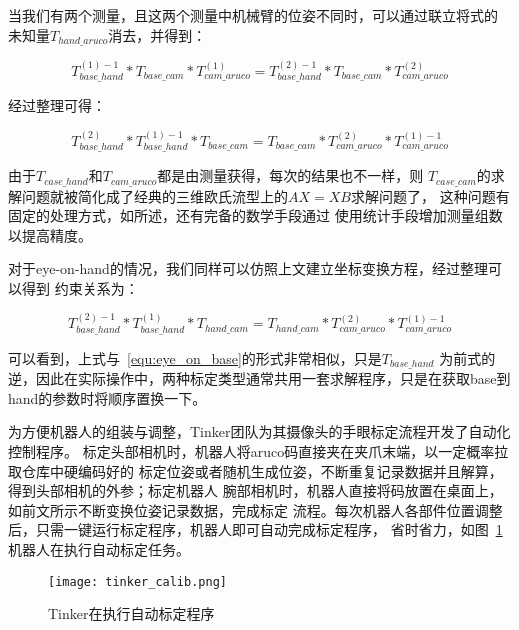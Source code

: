 当我们有两个测量，且这两个测量中机械臂的位姿不同时，可以通过联立将式的
未知量$T_{hand\_aruco}$消去，并得到：

\begin{equation}
  T_{base\_hand}^{(1)-1} * T_{base\_cam} * T_{cam\_aruco}^{(1)} = 
  T_{base\_hand}^{(2)-1} * T_{base\_cam} * T_{cam\_aruco}^{(2)}
\end{equation}

经过整理可得：

\begin{equation}
  T_{base\_hand}^{(2)} * T_{base\_hand}^{(1) -1} * T_{base\_cam}= 
  T_{base\_cam} * T_{cam\_aruco}^{(2)}  * T_{cam\_aruco}^{(1) -1} 
\label{equ:eye_on_base}
\end{equation}

由于$T_{case\_hand}$和$T_{cam\_aruco}$都是由测量获得，每次的结果也不一样，则
$T_{case\_cam}$的求解问题就被简化成了经典的三维欧氏流型上的$AX = XB$求解问题了，
这种问题有固定的处理方式，如\cite{park1994robo}所述，还有完备的数学手段通过
使用统计手段增加测量组数以提高精度\cite{tsai1989new}。

对于eye-on-hand的情况，我们同样可以仿照上文建立坐标变换方程，经过整理可以得到
约束关系为：

\begin{equation}
  T_{base\_hand}^{(2) -1} * T_{base\_hand}^{(1)} * T_{hand\_cam}= 
  T_{hand\_cam} * T_{cam\_aruco}^{(2)}  * T_{cam\_aruco}^{(1) -1} 
\label{equ:eye_on_hand}
\end{equation}

可以看到，上式与~\ref{equ:eye_on_base}的形式非常相似，只是$T_{base\_hand}$
为前式的逆，因此在实际操作中，两种标定类型通常共用一套求解程序，只是在获取base到
hand的参数时将顺序置换一下。

为方便机器人的组装与调整，Tinker团队为其摄像头的手眼标定流程开发了自动化控制程序。
标定头部相机时，机器人将aruco码直接夹在夹爪末端，以一定概率拉取仓库中硬编码好的
标定位姿或者随机生成位姿，不断重复记录数据并且解算，得到头部相机的外参；标定机器人
腕部相机时，机器人直接将码放置在桌面上，如前文所示不断变换位姿记录数据，完成标定
流程。每次机器人各部件位置调整后，只需一键运行标定程序，机器人即可自动完成标定程序，
省时省力，如图~\ref{fig:tinker_calib} 机器人在执行自动标定任务。

\begin{figure}[h] %
  \centering
  \texttt{[image: tinker\_calib.png]}
  \caption{Tinker在执行自动标定程序}
  \label{fig:tinker_calib}
\end{figure}


